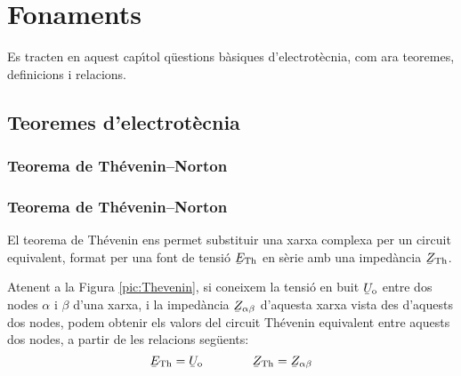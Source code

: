 \chapter{Fonaments}

Es tracten en aquest cap\'{\i}tol q\"{u}estions b\`{a}siques d'electrot\`{e}cnia, com ara teoremes, definicions
i relacions.

\section{Teoremes d'electrot\`{e}cnia}

\ifpdf
    \subsection{\texorpdfstring{Teorema de Th\'{e}venin--Norton}{Teorema de
    Th\'{e}venin-Norton}}\label{sec:thev-norton}
\else
    \subsection{Teorema de Th\'{e}venin--Norton}
\fi
\label{sec:T_N}

El teorema de Th\'{e}venin ens permet substituir una xarxa complexa per un circuit equivalent, format per una font de tensi\'{o} $\cmplx{E}\ped{Th}$ en s\`{e}rie amb una imped\`{a}ncia $\cmplx{Z}\ped{Th}$.

Atenent a la Figura \vref{pic:Thevenin}, si coneixem la tensi\'{o} en buit $\cmplx{U}\ped{o}$ entre dos nodes $\alpha$ i $\beta$ d'una xarxa, i la imped\`{a}ncia $\cmplx{Z}_{\alpha\beta}$ d'aquesta xarxa vista des d'aquests dos nodes, podem obtenir els valors del circuit Th\'{e}venin equivalent entre aquests dos nodes, a partir de les relacions seg\"{u}ents:
\begin{equation}
   \cmplx{E}\ped{Th} = \cmplx{U}\ped{o} \qquad\qquad  \cmplx{Z}\ped{Th} = \cmplx{Z}_{\alpha\beta}
\end{equation}

